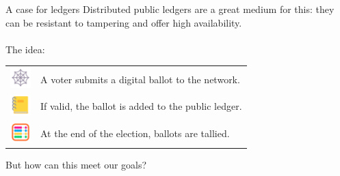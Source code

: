 \documentclass[aspectratio=169]{beamer}
\begin{document}
\begin{frame}{A case for ledgers}
    Distributed public ledgers are a great medium for this: they can be resistant to tampering and offer high availability. \\~\\

    The idea:
    \begin{table}
        \centering
        \begin{tabular}{>{\arraybackslash}m{40px} >{\arraybackslash}m{320px}}
            \includegraphics[width=30px]{images/web.png} & A voter submits a digital ballot to the network. \\
            \includegraphics[width=30px]{images/ledger.png} & If valid, the ballot is added to the public ledger. \\
            \includegraphics[width=30px]{images/abacus.png} & At the end of the election, ballots are tallied. \\
        \end{tabular}
    \end{table}

    But how can this meet our goals?
\end{frame}
\end{document}
